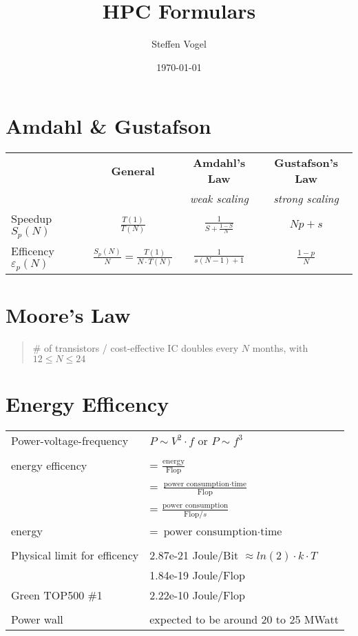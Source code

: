 \documentclass[11pt]{article}
\title{HPC Formulars}
\author{Steffen Vogel}
\date{\today}
\begin{document}
\section{Amdahl \& Gustafson}

\begin{tabular}{ l | c c c }

	& \textbf{General} & \textbf{Amdahl's Law} & \textbf{Gustafson's Law} \\
	&	  & \textit{weak scaling}	& \textit{strong scaling} \\
	\hline
	Speedup \( S_p(N) \)  & \( \frac{T(1)}{T(N)} \) & \( \frac{1}{S + \frac{1 - S}{N}} \) & \( Np + s \) \\
	Efficency \( \varepsilon_p(N) \) & \( \frac{S_p(N)}{N} = \frac{T(1)}{N \cdot T(N)} \) & \( \frac{1}{s(N-1) + 1} \) & \( \frac{1 - p}{N} \) \\
\end{tabular}

\section{Moore's Law}

\begin{quote}
	\# of transistors / cost-effective IC doubles every $N$ months, with $12 \leq N \leq 24$
\end{quote}

\section{Energy Efficency}

\begin{tabular}{ p{7cm} l }
	Power-voltage-frequency & \( P \sim V^2 \cdot f \) or \( P \sim f^3 \) \\
	& \\
	energy efficency & = \( \frac{\text{energy}}{\text{Flop}} \) \\
			 & = \( \frac{\text{power consumption} \cdot \text{time}}{\text{Flop}} \) \\
			 & = \( \frac{\text{power consumption}}{\text{Flop}/s} \) \\
	energy		 & = \( \text{power consumption} \cdot \text{time} \) \\
	& \\
	Physical limit for efficency 	& 2.87e-21 Joule/Bit \( \approx ln(2) \cdot k \cdot T \) \\
					& 1.84e-19 Joule/Flop \\
	Green TOP500 \#1		& 2.22e-10 Joule/Flop \\
	& \\
	Power wall			& expected to be around 20 to 25 MWatt \\
\end{tabular}
\end{document}
